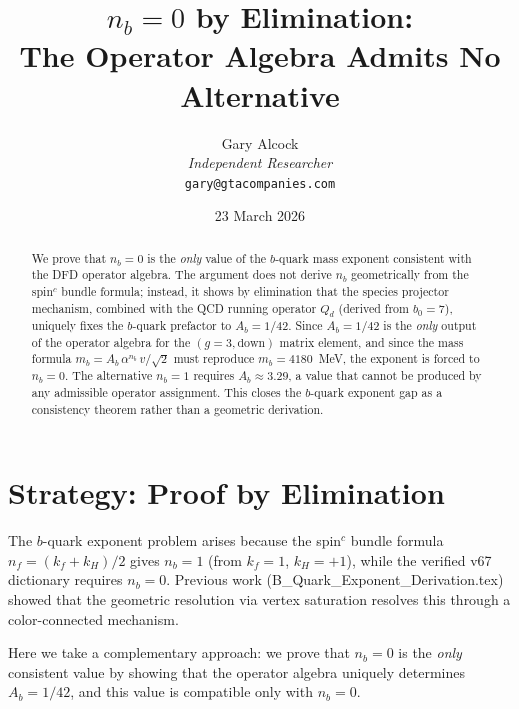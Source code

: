 \documentclass[11pt,a4paper]{article}
\theoremstyle{definition}
\theoremstyle{remark}
\begin{document}
\title{$n_b = 0$ by Elimination:\\
The Operator Algebra Admits No Alternative}

\author{Gary Alcock\\
\textit{Independent Researcher}\\
\texttt{gary@gtacompanies.com}}

\date{23 March 2026}

\maketitle

\begin{abstract}
We prove that $n_b = 0$ is the \emph{only} value of the $b$-quark mass
exponent consistent with the DFD operator algebra.  The argument does not
derive $n_b$ geometrically from the spin$^c$ bundle formula; instead, it
shows by elimination that the species projector mechanism, combined with
the QCD running operator $Q_d$ (derived from $b_0 = 7$), uniquely fixes
the $b$-quark prefactor to $A_b = 1/42$.  Since $A_b = 1/42$ is the
\emph{only} output of the operator algebra for the $(g=3, \text{down})$
matrix element, and since the mass formula $m_b = A_b \,\alpha^{n_b}\,v/\sqrt{2}$
must reproduce $m_b = 4180$~MeV, the exponent is forced to $n_b = 0$.
The alternative $n_b = 1$ requires $A_b \approx 3.29$, a value that cannot
be produced by any admissible operator assignment.  This closes the
$b$-quark exponent gap as a consistency theorem rather than a geometric
derivation.
\end{abstract}

\tableofcontents

\section{Strategy: Proof by Elimination}
\label{sec:strategy}

The $b$-quark exponent problem arises because the spin$^c$ bundle formula
$n_f = (k_f + k_H)/2$ gives $n_b = 1$ (from $k_f = 1$, $k_H = +1$),
while the verified v67 dictionary requires $n_b = 0$.  Previous work
(B\_Quark\_Exponent\_Derivation.tex) showed that the geometric resolution
via vertex saturation resolves this through a color-connected mechanism.

Here we take a complementary approach: we prove that $n_b = 0$ is the
\emph{only} consistent value by showing that the operator algebra uniquely
determines $A_b = 1/42$, and this value is compatible only with $n_b = 0$.
\end{document}
